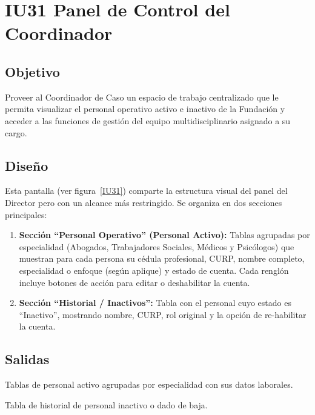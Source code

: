 \section{IU31 Panel de Control del Coordinador}

\subsection{Objetivo}
	Proveer al Coordinador de Caso un espacio de trabajo centralizado que le permita visualizar el personal operativo activo e inactivo de la Fundación y acceder a las funciones de gestión del equipo multidisciplinario asignado a su cargo.

\subsection{Diseño}
	Esta pantalla  (ver figura~\ref{IU31}) comparte la estructura visual del panel del Director pero con un alcance más restringido. Se organiza en dos secciones principales:
	\begin{enumerate}
		\item \textbf{Sección ``Personal Operativo'' (Personal Activo):} Tablas agrupadas por especialidad (Abogados, Trabajadores Sociales, Médicos y Psicólogos) que muestran para cada persona su cédula profesional, CURP, nombre completo, especialidad o enfoque (según aplique) y estado de cuenta. Cada renglón incluye botones de acción para editar o deshabilitar la cuenta.
		\item \textbf{Sección ``Historial / Inactivos'':} Tabla con el personal cuyo estado es ``Inactivo'', mostrando nombre, CURP, rol original y la opción de re-habilitar la cuenta.
	\end{enumerate}


\subsection{Salidas}
	\begin{Citemize}
		\item Tablas de personal activo agrupadas por especialidad con sus datos laborales.
		\item Tabla de historial de personal inactivo o dado de baja.
	\end{Citemize}

